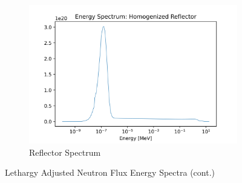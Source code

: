 \begin{figure}[H]\ContinuedFloat
\centering

\begin{subfigure}{0.95\textwidth}
  \includegraphics[width=0.95\linewidth]{figures/reflect_spec_homog}
  \caption{Reflector Spectrum}
  \label{fig:hom-reflec}
\end{subfigure}%


\caption{Lethargy Adjusted Neutron Flux Energy Spectra (cont.)}
\label{fig:hom-spec}
\end{figure}
